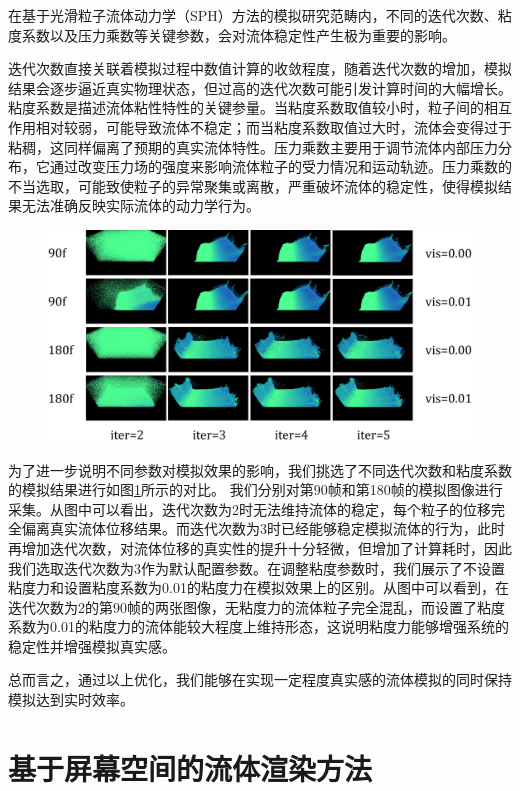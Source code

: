 在基于光滑粒子流体动力学（SPH）方法的模拟研究范畴内，不同的迭代次数、粘度系数以及压力乘数等关键参数，会对流体稳定性产生极为重要的影响。

迭代次数直接关联着模拟过程中数值计算的收敛程度，随着迭代次数的增加，模拟结果会逐步逼近真实物理状态，但过高的迭代次数可能引发计算时间的大幅增长。粘度系数是描述流体粘性特性的关键参量。当粘度系数取值较小时，粒子间的相互作用相对较弱，可能导致流体不稳定；而当粘度系数取值过大时，流体会变得过于粘稠，这同样偏离了预期的真实流体特性。压力乘数主要用于调节流体内部压力分布，它通过改变压力场的强度来影响流体粒子的受力情况和运动轨迹。压力乘数的不当选取，可能致使粒子的异常聚集或离散，严重破坏流体的稳定性，使得模拟结果无法准确反映实际流体的动力学行为。


\begin{figure}[ht]
    \centering
    \includegraphics[width=0.9\linewidth]{image/simResult.png}
    \label{fig:simResult}
\end{figure}

为了进一步说明不同参数对模拟效果的影响，我们挑选了不同迭代次数和粘度系数的模拟结果进行如图\ref{fig:simResult}所示的对比。
我们分别对第90帧和第180帧的模拟图像进行采集。从图中可以看出，迭代次数为2时无法维持流体的稳定，每个粒子的位移完全偏离真实流体位移结果。而迭代次数为3时已经能够稳定模拟流体的行为，此时再增加迭代次数，对流体位移的真实性的提升十分轻微，但增加了计算耗时，因此我们选取迭代次数为3作为默认配置参数。在调整粘度参数时，我们展示了不设置粘度力和设置粘度系数为0.01的粘度力在模拟效果上的区别。从图中可以看到，在迭代次数为2的第90帧的两张图像，无粘度力的流体粒子完全混乱，而设置了粘度系数为0.01的粘度力的流体能较大程度上维持形态，这说明粘度力能够增强系统的稳定性并增强模拟真实感。


总而言之，通过以上优化，我们能够在实现一定程度真实感的流体模拟的同时保持模拟达到实时效率。


\chapter{基于屏幕空间的流体渲染方法}

